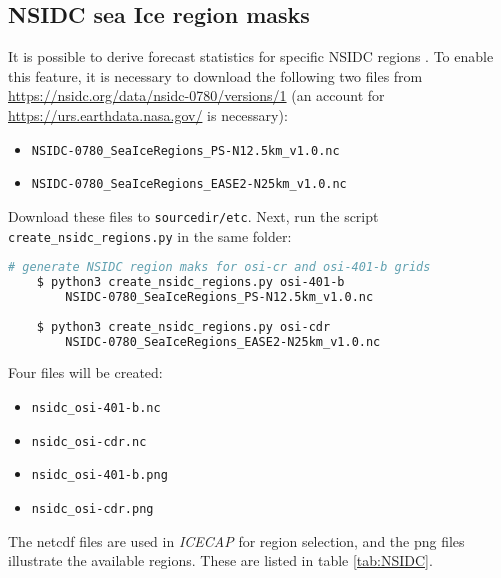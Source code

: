 \documentclass[DIV=10, parskip=full]{scrreprt}
\newcommand{\ice}{\textit{ICECAP}\xspace}
\begin{document}
\subsection{NSIDC sea Ice region masks}
\label{sec:nsidc}
It is possible to derive forecast statistics for specific NSIDC regions \citep{Meier2023}. To enable this feature, it is necessary to download the following two files from \url{https://nsidc.org/data/nsidc-0780/versions/1} (an account for \url{https://urs.earthdata.nasa.gov/} is necessary):
\begin{itemize}
	\item \texttt{NSIDC-0780\_SeaIceRegions\_PS-N12.5km\_v1.0.nc} 
	\item  \texttt{NSIDC-0780\_SeaIceRegions\_EASE2-N25km\_v1.0.nc} 
\end{itemize}

Download these files to \texttt{sourcedir/etc}. Next, run the script \texttt{create\_nsidc\_regions.py} in the same folder:

  \begin{lstlisting}[language=bash]
	# generate NSIDC region maks for osi-cr and osi-401-b grids
	$ python3 create_nsidc_regions.py osi-401-b 
		NSIDC-0780_SeaIceRegions_PS-N12.5km_v1.0.nc
	
	$ python3 create_nsidc_regions.py osi-cdr 
		NSIDC-0780_SeaIceRegions_EASE2-N25km_v1.0.nc
\end{lstlisting}

Four files will be created:
\begin{itemize}
	\item \texttt{nsidc\_osi-401-b.nc}
	\item \texttt{nsidc\_osi-cdr.nc}
	\item \texttt{nsidc\_osi-401-b.png}
	\item \texttt{nsidc\_osi-cdr.png}
\end{itemize}

The netcdf files are used in \ice for region selection, and the png files illustrate the available regions. These are listed in table \ref{tab:NSIDC}.  \\
\end{document}
